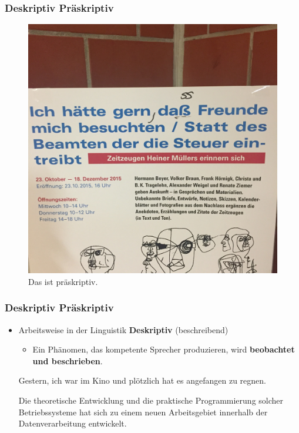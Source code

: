 \begin{frame}
\frametitle{Deskriptiv \vs Präskriptiv}

\begin{figure}
\centering
	\includegraphics[scale=.065]{material/05praeskriptiv}
	\caption{Das ist präskriptiv.}
\end{figure}

\end{frame}

\begin{frame}
\frametitle{Deskriptiv \vs Präskriptiv}

\begin{itemize}
	\item Arbeitsweise in der Linguistik \ras \textbf{Deskriptiv} (beschreibend)
	\begin{itemize}
		\item Ein Phänomen, das kompetente Sprecher produzieren, wird \textbf{beobachtet und beschrieben}. 	
	\end{itemize}
	
	\ea \alert{Gestern, ich} war im Kino und plötzlich hat es angefangen zu regnen.
	\z
	
	\ea Die theoretische Entwicklung und die praktische Programmierung solcher Betriebssysteme \alert{hat} sich zu einem neuen Arbeitsgebiet innerhalb der Datenverarbeitung entwickelt. \citep{Goschler14a}
	\z
	
\end{itemize}

\end{frame}

